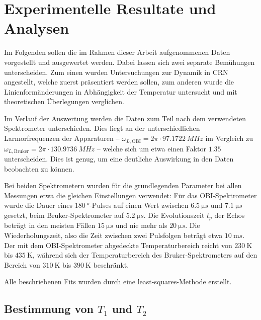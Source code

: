 \chapter{Experimentelle Resultate und Analysen}
\label{chapter:experiment}

Im Folgenden sollen die im Rahmen dieser Arbeit aufgenommenen Daten vorgestellt und ausgewertet werden. Dabei lassen sich zwei separate Bemühungen unterscheiden. Zum einen wurden Untersuchungen zur Dynamik in CRN angestellt, welche zuerst präsentiert werden sollen, zum anderen wurde die Linienformänderungen in Abhängigkeit der Temperatur untersucht und mit theoretischen Überlegungen verglichen.

Im Verlauf der Auswertung werden die Daten zum Teil nach dem verwendeten Spektrometer unterschieden. Dies liegt an der unterschiedlichen Larmorfrequenzen der Apparaturen -- $\omega_{L, \text{OBI}} = 2\pi \cdot \SI{97.1722}{MHz}$ im Vergleich zu $\omega_{L, \text{Bruker}} = 2\pi \cdot \SI{130.9736}{MHz}$ -- welche sich um etwa einen Faktor $\SI{1.35}{}$ unterscheiden. Dies ist genug, um eine deutliche Auswirkung in den Daten beobachten zu können.

Bei beiden Spektrometern wurden für die grundlegenden Parameter bei allen Messungen etwa die gleichen Einstellungen verwendet: Für das OBI-Spektrometer wurde die Dauer eines $\SI{180}{\degree}$-Pulses auf einen Wert zwischen $\SI{6.5}{\micro s}$ und $\SI{7.1}{\micro s}$ gesetzt, beim Bruker-Spektrometer auf $\SI{5.2}{\micro s}$. Die Evolutionszeit $t_p$ der Echos beträgt in den meisten Fällen $\SI{15}{\micro s}$ und nie mehr als $\SI{20}{\micro s}$. Die Wiederholungszeit, also die Zeit zwischen zwei Pulsfolgen beträgt etwa $\SI{10}{\milli s}$. Der mit dem OBI-Spektrometer abgedeckte Temperaturbereich reicht von $\SI{230}{\kelvin}$ bis $\SI{435}{\kelvin}$, während sich der Temperaturbereich des Bruker-Spektrometers auf den Bereich von $\SI{310}{\kelvin}$ bis $\SI{390}{\kelvin}$ beschränkt.

Alle beschriebenen Fits wurden durch eine least-squares-Methode erstellt.


\section{Bestimmung von $T_1$ und $T_2$} \label{section:res:T_1}

